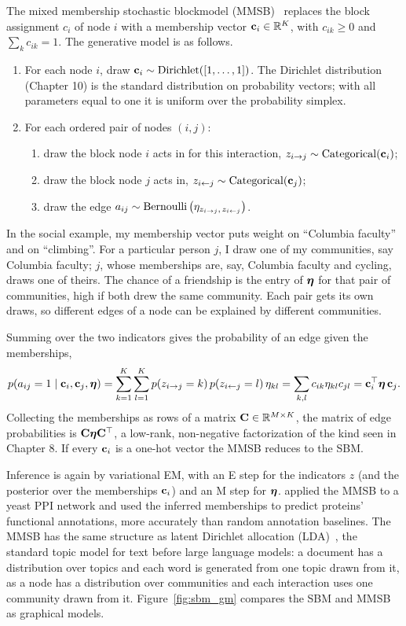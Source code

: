 The mixed membership stochastic blockmodel (MMSB)~\citep{airoldi2008} replaces the block assignment $c_i$ of node $i$ with a membership vector $\mathbf{c}_i\in\mathbb{R}^K$, with $c_{ik}\ge0$ and $\sum_kc_{ik}=1$. The generative model is as follows.
\begin{enumerate}
  \item For each node $i$, draw $\mathbf{c}_i\sim\operatorname{Dirichlet}([1,\dots,1])$. The Dirichlet distribution (Chapter 10) is the standard distribution on probability vectors; with all parameters equal to one it is uniform over the probability simplex.
  \item For each ordered pair of nodes $(i,j)$:
  \begin{enumerate}
    \item draw the block node $i$ acts in for this interaction, $z_{i\to j}\sim\operatorname{Categorical}(\mathbf{c}_i)$;
    \item draw the block node $j$ acts in, $z_{i\leftarrow j}\sim\operatorname{Categorical}(\mathbf{c}_j)$;
    \item draw the edge $a_{ij}\sim\operatorname{Bernoulli}\big(\eta_{z_{i\to j},\,z_{i\leftarrow j}}\big)$.
  \end{enumerate}
\end{enumerate}
In the social example, my membership vector puts weight on ``Columbia faculty'' and on ``climbing''. For a particular person $j$, I draw one of my communities, say Columbia faculty; $j$, whose memberships are, say, Columbia faculty and cycling, draws one of theirs. The chance of a friendship is the entry of $\boldsymbol{\eta}$ for that pair of communities, high if both drew the same community. Each pair gets its own draws, so different edges of a node can be explained by different communities.

Summing over the two indicators gives the probability of an edge given the memberships,
\begin{equation}
  p(a_{ij}=1\mid\mathbf{c}_i,\mathbf{c}_j,\boldsymbol{\eta}) = \sum_{k=1}^K\sum_{l=1}^Kp(z_{i\to j}=k)\,p(z_{i\leftarrow j}=l)\,\eta_{kl} = \sum_{k,l}c_{ik}\eta_{kl}c_{jl} = \mathbf{c}_i^\top\boldsymbol{\eta}\,\mathbf{c}_j .
\end{equation}
Collecting the memberships as rows of a matrix $\mathbf{C}\in\mathbb{R}^{M\times K}$, the matrix of edge probabilities is $\mathbf{C}\boldsymbol{\eta}\mathbf{C}^\top$, a low-rank, non-negative factorization of the kind seen in Chapter 8. If every $\mathbf{c}_i$ is a one-hot vector the MMSB reduces to the SBM.

Inference is again by variational EM, with an E step for the indicators $z$ (and the posterior over the memberships $\mathbf{c}_i$) and an M step for $\boldsymbol{\eta}$. \citet{airoldi2008} applied the MMSB to a yeast PPI network and used the inferred memberships to predict proteins' functional annotations, more accurately than random annotation baselines. The MMSB has the same structure as latent Dirichlet allocation (LDA)~\citep{blei2003}, the standard topic model for text before large language models: a document has a distribution over topics and each word is generated from one topic drawn from it, as a node has a distribution over communities and each interaction uses one community drawn from it. Figure~\ref{fig:sbm_gm} compares the SBM and MMSB as graphical models.

